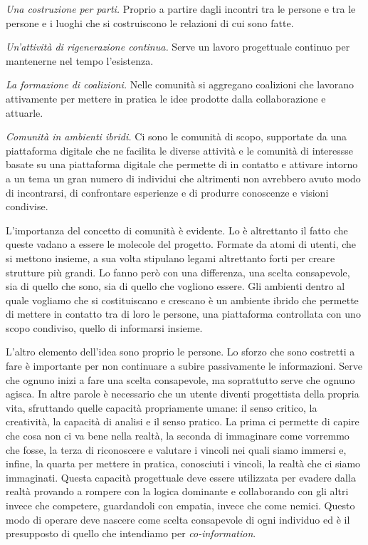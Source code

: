 \documentclass{article}
\begin{document}
\textit{Una costruzione per parti.} Proprio a partire dagli incontri tra le persone e tra le persone e i luoghi che si costruiscono le relazioni di cui sono fatte. 

\vspace{0.5 cm}

\textit{Un’attività di rigenerazione continua.} Serve un lavoro progettuale continuo per mantenerne nel tempo l’esistenza.

\vspace{0.5 cm}

\textit{La formazione di coalizioni.} Nelle comunità si aggregano coalizioni che lavorano attivamente per mettere in pratica le idee prodotte dalla collaborazione e attuarle.

\vspace{0.5 cm}

\textit{Comunità in ambienti ibridi.} Ci sono le comunità di scopo, supportate da una piattaforma digitale che ne facilita le diverse attività e le comunità di interessse basate su una piattaforma digitale che permette di in contatto e attivare intorno a un tema un gran numero di individui che altrimenti non avrebbero avuto modo di incontrarsi, di confrontare esperienze e di produrre conoscenze e visioni condivise.

\vspace{0.5 cm}

L’importanza del concetto di comunità è evidente. Lo è altrettanto il fatto che queste vadano a essere le molecole del progetto. Formate da atomi di utenti, che si mettono insieme, a sua volta stipulano legami altrettanto forti per creare strutture più grandi. Lo fanno però con una differenza, una scelta consapevole, sia di quello che sono, sia di quello che vogliono essere. Gli ambienti dentro al quale vogliamo che si costituiscano e crescano è un ambiente ibrido che permette di mettere in contatto tra di loro le persone, una piattaforma controllata con uno scopo condiviso, quello di informarsi insieme.

L’altro elemento dell’idea sono proprio le persone. Lo sforzo che sono costretti a fare è importante per non continuare a subire passivamente le informazioni. Serve che ognuno inizi a fare una scelta consapevole, ma soprattutto serve che ognuno agisca. In altre parole è necessario che un utente diventi progettista della propria vita, sfruttando quelle capacità propriamente umane: il senso critico, la creatività, la capacità di analisi e il senso pratico. La prima ci permette di capire che cosa non ci va bene nella realtà, la seconda di immaginare come vorremmo che fosse, la terza di riconoscere e valutare i vincoli nei quali siamo immersi e, infine, la quarta per mettere in pratica, conosciuti i vincoli, la realtà che ci siamo immaginati. Questa capacità progettuale deve essere utilizzata per evadere dalla realtà provando a rompere con la logica dominante e collaborando con gli altri invece che competere, guardandoli con empatia, invece che come nemici. Questo modo di operare deve nascere come scelta consapevole di ogni individuo ed è il presupposto di quello che intendiamo per \textit{co-information}. 
\end{document}
